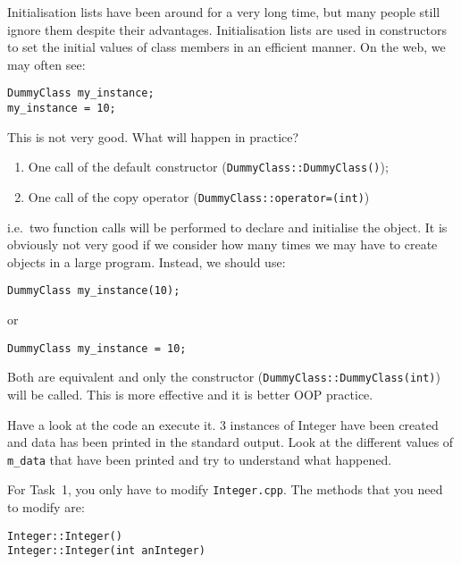 Initialisation lists have been around for a very long time, but many people still ignore them despite their advantages. 
Initialisation lists are used in constructors to set the initial values of class members in an efficient manner. 
On the web, we may often see:
\begin{lstlisting}
DummyClass my_instance;
my_instance = 10;
\end{lstlisting}
%
This is not very good. 
What will happen in practice?
\begin{enumerate}
\item One call of the default constructor (\verb+DummyClass::DummyClass()+);
\item One call of the copy operator (\verb+DummyClass::operator=(int)+)
\end{enumerate}
i.e.~two function calls will be performed to declare and initialise the object. 
It is obviously not very good if we consider how many times we may have to create objects in a large program. 
Instead, we should use:
\begin{lstlisting}
DummyClass my_instance(10);
\end{lstlisting}
or
\begin{lstlisting}
DummyClass my_instance = 10;
\end{lstlisting}

Both are equivalent and only the constructor (\verb+DummyClass::DummyClass(int)+) will be called. 
This is more effective and it is better OOP practice. 

Have a look at the code an execute it. 
3 instances of Integer have been created and data has been printed in the standard output. 
Look at the different values of \verb+m_data+ that have been printed and try to understand what happened.

For Task~1, you only have to modify \verb+Integer.cpp+. 
The methods that you need to modify are:
\begin{verbatim}
Integer::Integer()
Integer::Integer(int anInteger)
\end{verbatim}


